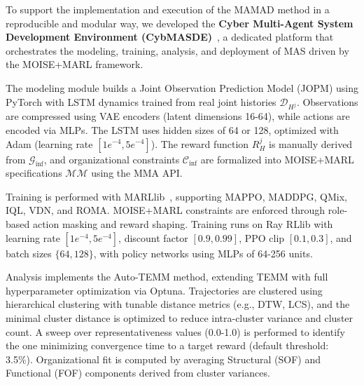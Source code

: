\documentclass[pdflatex,sn-mathphys-num]{sn-jnl}%
\theoremstyle{thmstyleone}%
\theoremstyle{thmstyletwo}%
\theoremstyle{thmstylethree}%
\begin{document}
To support the implementation and execution of the MAMAD method in a reproducible and modular way, we developed the \textbf{Cyber Multi-Agent System Development Environment (CybMASDE)}~\footnotemark[1], a dedicated platform that orchestrates the modeling, training, analysis, and deployment of MAS driven by the MOISE+MARL framework.



The modeling module builds a Joint Observation Prediction Model (JOPM) using PyTorch with LSTM dynamics trained from real joint histories $\mathcal{D}_{H^j}$. Observations are compressed using VAE encoders (latent dimensions 16-64), while actions are encoded via MLPs. The LSTM uses hidden sizes of 64 or 128, optimized with Adam (learning rate $[1e^{-4}, 5e^{-4}]$). The reward function $R^j_H$ is manually derived from $\mathcal{G}_{\text{inf}}$, and organizational constraints $\mathcal{C}_{\text{inf}}$ are formalized into MOISE+MARL specifications $\mathcal{MM}$ using the MMA API.

Training is performed with MARLlib~\cite{hu2022marllib}, supporting MAPPO, MADDPG, QMix, IQL, VDN, and ROMA. MOISE+MARL constraints are enforced through role-based action masking and reward shaping. Training runs on Ray RLlib with learning rate $[1e^{-4}, 5e^{-4}]$, discount factor $[0.9, 0.99]$, PPO clip $[0.1, 0.3]$, and batch sizes $\{64, 128\}$, with policy networks using MLPs of 64-256 units.

Analysis implements the Auto-TEMM method, extending TEMM with full hyperparameter optimization via Optuna. Trajectories are clustered using hierarchical clustering with tunable distance metrics (e.g., DTW, LCS), and the minimal cluster distance is optimized to reduce intra-cluster variance and cluster count. A sweep over representativeness values (0.0-1.0) is performed to identify the one minimizing convergence time to a target reward (default threshold: 3.5\%). Organizational fit is computed by averaging Structural (SOF) and Functional (FOF) components derived from cluster variances.
\end{document}
